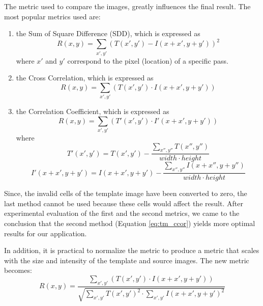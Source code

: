 \begin{itemize}
        The metric used to compare the images, greatly influences the final
        result. The most popular metrics used are:
        \begin{enumerate}
            \item the Sum of Square Difference (SDD), which is expressed as
                \begin{equation}
                    R(x, y) = \sum_{x', y'} (T(x', y') - I(x + x', y + y'))^2
                \end{equation}
                where $x'$ and $y'$ correspond to the pixel (location) of
                a specific pass.
            \item the Cross Correlation, which is expressed as
                \begin{equation} \label{eq:tm_ccor}
                    R(x, y) = \sum_{x', y'} (T(x', y') \cdot I(x + x', y + y'))
                \end{equation}
            \item the Correlation Coefficient, which is expressed as
                \begin{equation}
                    R(x, y) =
                    \sum_{x', y'} (T'(x', y') \cdot I'(x + x', y + y'))
                \end{equation}
                where
                \begin{equation}
                    T'(x', y') = T(x', y') -
                    \frac{\sum_{x'',y''}T(x'', y'')}{width \cdot height}
                \end{equation}
                \begin{equation}
                    I'(x + x', y + y') = I(x + x', y + y') -
                    \frac{\sum_{x'',y''}I(x + x'',y + y'')}{width \cdot height}
                \end{equation}
        \end{enumerate}

        Since, the invalid cells of the template image have been converted
        to zero, the last method cannot be used because these cells would
        affect the result. After experimental evaluation of the first and
        the second metrics, we came to the conclusion that the second
        method (Equation \ref{eq:tm_ccor}) yields more optimal results
        for our application.

        In addition, it is practical to normalize the metric to produce a
        metric that scales with the size and intensity of the template
        and source images. The new metric becomes:
        \begin{equation}
            R(x, y) = \frac
            {\sum_{x', y'} (T(x', y') \cdot I(x + x', y + y'))}
            {\sqrt{
            \sum_{x', y'} T(x', y')^2 \cdot \sum_{x', y'} I(x + x', y + y')^2}}
        \end{equation}


\end{itemize}
